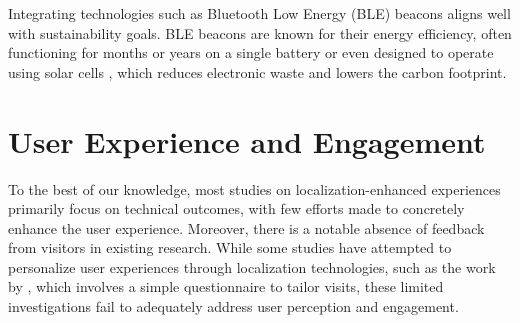 Integrating technologies such as Bluetooth Low Energy (BLE) beacons aligns well with sustainability goals. BLE beacons are known for their energy efficiency, often functioning for months or years on a single battery or even designed to operate using solar cells \cite{spachos_ble_2020}, which reduces electronic waste and lowers the carbon footprint.

\section{User Experience and Engagement}

To the best of our knowledge, most studies on localization-enhanced experiences primarily focus on technical outcomes, with few efforts made to concretely enhance the user experience. Moreover, there is a notable absence of feedback from visitors in existing research. While some studies have attempted to personalize user experiences through localization technologies, such as the work by \cite{alletto_indoor_2016}, which involves a simple questionnaire to tailor visits, these limited investigations fail to adequately address user perception and engagement.